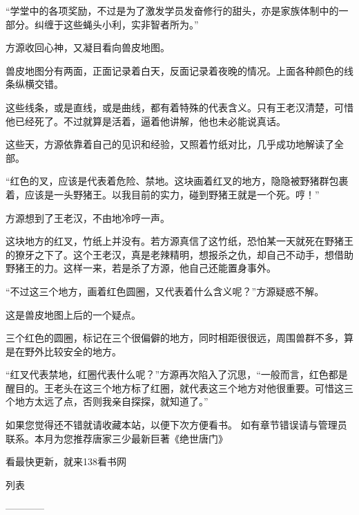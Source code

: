 \begin{this_body}
“学堂中的各项奖励，不过是为了激发学员发奋修行的甜头，亦是家族体制中的一部分。纠缠于这些蝇头小利，实非智者所为。”

方源收回心神，又凝目看向兽皮地图。

兽皮地图分有两面，正面记录着白天，反面记录着夜晚的情况。上面各种颜色的线条纵横交错。

这些线条，或是直线，或是曲线，都有着特殊的代表含义。只有王老汉清楚，可惜他已经死了。不过就算是活着，逼着他讲解，他也未必能说真话。

这些天，方源依靠着自己的见识和经验，又照着竹纸对比，几乎成功地解读了全部。

“红色的叉，应该是代表着危险、禁地。这块画着红叉的地方，隐隐被野猪群包裹着，应该是一头野猪王。以我目前的实力，碰到野猪王就是一个死。哼！”

方源想到了王老汉，不由地冷哼一声。

这块地方的红叉，竹纸上并没有。若方源真信了这竹纸，恐怕某一天就死在野猪王的獠牙之下了。这个王老汉，真是老辣精明，想报杀之仇，却自己不动手，想借助野猪王的力。这样一来，若是杀了方源，他自己还能置身事外。

“不过这三个地方，画着红色圆圈，又代表着什么含义呢？”方源疑惑不解。

这是兽皮地图上后的一个疑点。

三个红色的圆圈，标记在三个很偏僻的地方，同时相距很很远，周围兽群不多，算是在野外比较安全的地方。

“红叉代表禁地，红圈代表什么呢？”方源再次陷入了沉思，“一般而言，红色都是醒目的。王老头在这三个地方标了红圈，就代表这三个地方对他很重要。可惜这三个地方太远了点，否则我亲自探探，就知道了。”

如果您觉得还不错就请收藏本站，以便下次方便看书。 如有章节错误请与管理员联系。本月为您推荐唐家三少最新巨著《绝世唐门》

看最快更新，就来138看书网

列表

------------

\end{this_body}

